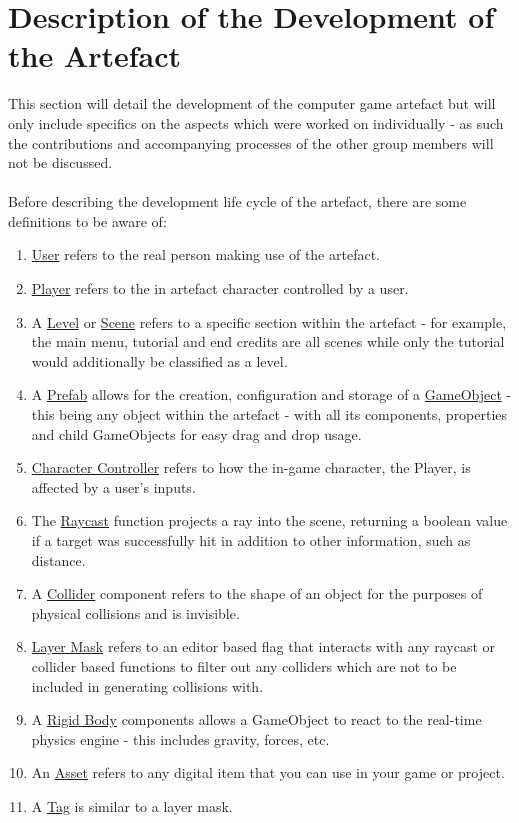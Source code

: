 \section{Description of the Development of the Artefact}
This section will detail the development of the computer game artefact but will only include specifics on the aspects which were worked on individually - as such the contributions and accompanying processes of the other group members will not be discussed. 
\\\\
Before describing the development life cycle of the artefact, there are some definitions to be aware of:
\begin{enumerate}
\item \underline{User} refers to the real person making use of the artefact.
\item \underline{Player} refers to the in artefact character controlled by a user.
\item A \underline{Level} or \underline{Scene} refers to a specific section within the artefact - for example, the main menu, tutorial and end credits are all scenes while only the tutorial would additionally be classified as a level.
\item A \underline{Prefab} allows for the creation, configuration and storage of a \underline{GameObject} - this being any object within the artefact - with all its components, properties and child GameObjects for easy drag and drop usage.
\item \underline{Character Controller} refers to how the in-game character, the Player, is affected by a user's inputs.
\item The \underline{Raycast} function projects a ray into the scene, returning a boolean value if a target was successfully hit in addition to other information, such as distance.
\item A \underline{Collider} component refers to the shape of an object for the purposes of physical collisions and is invisible.
\item \underline{Layer Mask} refers to an editor based flag that interacts with any raycast or collider based functions to filter out any colliders which are not to be included in generating collisions with.
\item A \underline{Rigid Body} components allows a GameObject to react to the real-time physics engine - this includes gravity, forces, etc.
\item An \underline{Asset} refers to any digital item that you can use in your game or project.
\item A \underline{Tag} is similar to a layer mask.
\end{enumerate}

